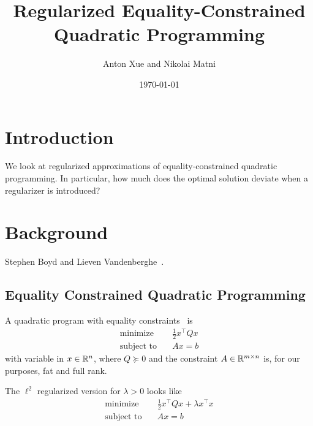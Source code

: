 \documentclass[12pt]{article}
\title{Regularized Equality-Constrained Quadratic Programming}
\author{Anton Xue and Nikolai Matni}
\date{\today}
\date{}
\begin{document}
\maketitle

\section{Introduction}
We look at regularized approximations
of equality-constrained quadratic programming.
In particular, how much does the optimal solution deviate
when a regularizer is introduced?


\section{Background}
Stephen Boyd and Lieven Vandenberghe~\cite{boyd2004convex}.

\subsection{Equality Constrained Quadratic Programming}

A quadratic program with equality constraints~\cite{boyd2004convex} is
\begin{align}
  \text{minimize} &\quad \frac{1}{2} x^\top Q x
    \label{eqn:qp} \\
  \text{subject to} &\quad Ax = b \nonumber
\end{align}
with variable in \(x \in {\mathbb{R}}^n\),
where \(Q \succeq 0\) and the constraint \(A \in {\mathbb{R}}^{m \times n}\) is,
for our purposes, fat and full rank.

The \(\ell^2\) regularized version for \(\lambda > 0\) looks like
\begin{align}
  \text{minimize} &\quad \frac{1}{2} x^\top Q x + \lambda x^\top x
    \label{eqn:reg-qp} \\
  \text{subject to} &\quad Ax = b \nonumber
\end{align}
\end{document}
